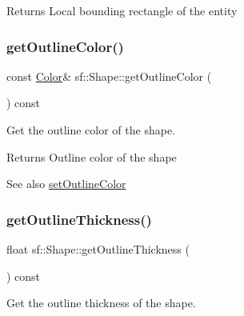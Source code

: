 \begin{DoxyReturn}{Returns}
Local bounding rectangle of the entity \begin{DoxyVerb}\end{DoxyVerb}
 
\end{DoxyReturn}
\mbox{\label{classsf_1_1_shape_a6598feed5fea1325a36b0f3a615ac55c}} 
\subsubsection{\texorpdfstring{getOutlineColor()}{getOutlineColor()}}
{\footnotesize\ttfamily const \mbox{\hyperlink{classsf_1_1_color}{Color}}\& sf\+::\+Shape\+::get\+Outline\+Color (\begin{DoxyParamCaption}{ }\end{DoxyParamCaption}) const}



Get the outline color of the shape. 

\begin{DoxyReturn}{Returns}
Outline color of the shape
\end{DoxyReturn}
\begin{DoxySeeAlso}{See also}
\mbox{\hyperlink{classsf_1_1_shape_a5978f41ee349ac3c52942996dcb184f7}{set\+Outline\+Color}} \begin{DoxyVerb}\end{DoxyVerb}
 
\end{DoxySeeAlso}
\mbox{\label{classsf_1_1_shape_a1d4d5299c573a905e5833fc4dce783a7}} 
\subsubsection{\texorpdfstring{getOutlineThickness()}{getOutlineThickness()}}
{\footnotesize\ttfamily float sf\+::\+Shape\+::get\+Outline\+Thickness (\begin{DoxyParamCaption}{ }\end{DoxyParamCaption}) const}



Get the outline thickness of the shape. 


